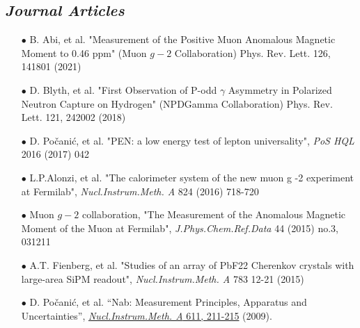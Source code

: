 \documentclass{article}[10pt]
\begin{document}
\subsection*{\emph{Journal Articles}}
\begin{itemize}
\item [$\bullet$] B. Abi, et al. "Measurement of the Positive Muon Anomalous Magnetic Moment to 0.46 ppm" (Muon $g-2$ Collaboration) Phys. Rev. Lett. 126, 141801 (2021)
\item [$\bullet$] D. Blyth, et al. "First Observation of P-odd $\gamma$ Asymmetry in Polarized Neutron Capture on Hydrogen" (NPDGamma Collaboration) Phys. Rev. Lett. 121, 242002 (2018)
\item [$\bullet$] D. Po\v{c}ani\'c, et al. "PEN: a low energy test of lepton universality", \emph{PoS HQL} 2016 (2017) 042
\item [$\bullet$] L.P.Alonzi, et al. "The calorimeter system of the new muon g -2 experiment at Fermilab", \emph{Nucl.Instrum.Meth. A} 824 (2016) 718-720
\item [$\bullet$] Muon $g-2$ collaboration, "The Measurement of the Anomalous Magnetic Moment of the Muon at Fermilab", \emph{J.Phys.Chem.Ref.Data} 44 (2015) no.3, 031211
\item [$\bullet$] A.T. Fienberg, et al. "Studies of an array of PbF22 Cherenkov crystals with large-area SiPM readout", \emph{Nucl.Instrum.Meth. A} 783 12-21 (2015)
\item [$\bullet$] D. Po\v{c}ani\'c, et al. ``Nab: Measurement Principles, Apparatus and Uncertainties'', \href{http://www.sciencedirect.com/science?_ob=ArticleURL&_udi=B6TJM-4WY6JS6-B&_user=709071&_coverDate=12/11/2009&_rdoc=1&_fmt=high&_orig=search&_origin=search&_sort=d&_docanchor=&view=c&_searchStrId=1563612201&_rerunOrigin=google&_acct=C000039638&_version=1&_urlVersion=0&_userid=709071&md5=602265f8ed1e05dbcd605115545a0871&searchtype=a}{\emph{Nucl.Instrum.Meth. A} 611, 211-215} (2009).
\end{itemize}


\end{document}
